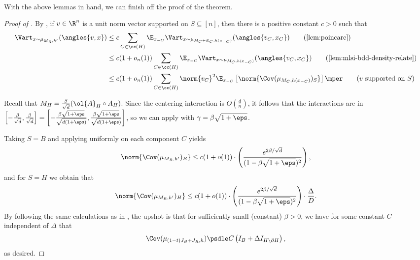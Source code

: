 \documentclass[11pt,letterpaper]{article}
\begin{document}
With the above lemmas in hand, we can finish off the proof of the theorem.
\begin{proof}[Proof of ]
    By , if $v \in \R^n$ is a unit norm vector supported on $S \subseteq [n]$, then there is a positive constant $c > 0$ such that 
    \begin{align*}
        \Vart_{x \sim \mu_{M_R, h'}}(\angles{v, x}) &\le c \sum_{C \in \cc(H)} \E_{x_{-C}} \Vart_{x \sim \mu_{M_C + E_C, h(x_{-C})}}(\angles{v_C, x_C}) \tag*{(\text{\Cref{lem:poincare}})}\\
        &\le c(1+o_n(1)) \sum_{C \in \cc(H)} \E_{x_{-C}} \Vart_{x \sim \mu_{M_C, h(x_{-C})}}(\angles{v_C, x_C}) \tag*{(\text{\Cref{lem:mlsi-bdd-density-relate}})} \\
        &\le c(1+o_n(1)) \sum_{C \in \cc(H)} \norm{v_C}^2 \E_{x_{-C}} \left[ \norm{\Cov(\mu_{M_C, h(x_{-C})})_{S}}\right]\mper \tag*{(\text{$v$ supported on $S$})}
    \end{align*}

    Recall that $M_H = \frac{\beta}{\sqrt{d}}(\ol{A}_H \circ A_H)$.
    Since the centering interaction is $O(\frac{d}{n})$, it follows that 
    the interactions are in $\left[ -\frac{\beta}{\sqrt{d}} , \frac{\beta}{\sqrt{d}} \right] = \left[ - \frac{\beta\sqrt{1+\eps}}{\sqrt{d(1+\eps)}} , \frac{\beta\sqrt{1+\eps}}{\sqrt{d(1+\eps)}} \right]$, so we can apply  with $\gamma = \beta\sqrt{1+\eps}$. 
    
    Taking $S = B$ and applying  uniformly on each component $C$ yields
    \begin{align*}
        \norm{\Cov(\mu_{M_R, h'})_B} \le c(1+o(1)) \cdot \left(\frac{e^{2\beta/\sqrt{d}}}{(1-\beta\sqrt{1+\eps})^2}\right),
    \end{align*}
    and for $S = H$ we obtain that 
    \begin{align*}
        \norm{\Cov(\mu_{M_R, h'})_H} \le c(1+o(1)) \cdot \left(\frac{e^{2\beta/\sqrt{d}}}{(1-\beta\sqrt{1+\eps})^2} \right) \cdot \frac{\Delta}{D} .
    \end{align*}
    By following the same calculations as in , the upshot is that for sufficiently small (constant) $\beta > 0$, we have for some constant $C$ independent of $\Delta$ that
    \begin{align*}
        \Cov(\mu_{(1-t)J_B + J_R, h}) \psdle C \left( I_B + \Delta I_{H \setminus \partial H} \right),
    \end{align*}
    as desired.
\end{proof}
\end{document}
